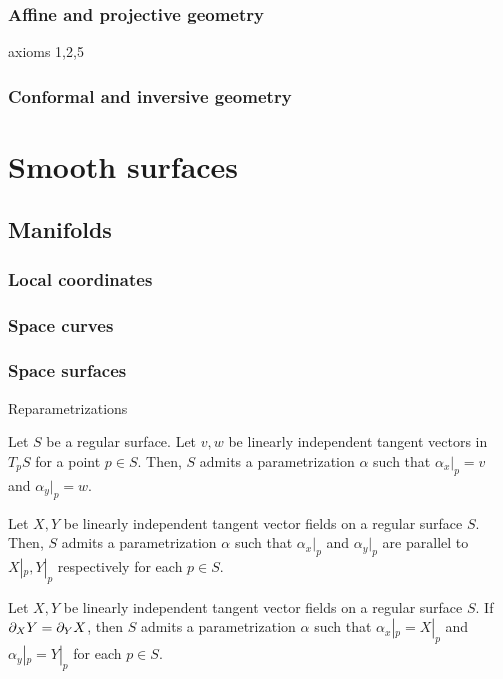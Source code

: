 \documentclass{../../large}
\begin{document}
\section{Affine and projective geometry}
axioms 1,2,5
\section{Conformal and inversive geometry}






\part{Smooth surfaces}
\chapter{Manifolds}
\section{Local coordinates}

\section{Space curves}

\section{Space surfaces}



Reparametrizations

\begin{thm}
Let $S$ be a regular surface.
Let $v,w$ be linearly independent tangent vectors in $T_pS$ for a point $p\in S$.
Then, $S$ admits a parametrization $\alpha$ such that $\alpha_x|_p=v$ and $\alpha_y|_p=w$.
\end{thm}
\begin{thm}
Let $X,Y$ be linearly independent tangent vector fields on a regular surface $S$.
Then, $S$ admits a parametrization $\alpha$ such that $\alpha_x|_p$ and $\alpha_y|_p$ are parallel to $X|_p,Y|_p$ respectively for each $p\in S$.
\end{thm}
\begin{thm}
Let $X,Y$ be linearly independent tangent vector fields on a regular surface $S$.
If $\pd_XY=\pd_YX$, then $S$ admits a parametrization $\alpha$ such that $\alpha_x|_p=X|_p$ and $\alpha_y|_p=Y|_p$ for each $p\in S$.
\end{thm}
\end{document}
